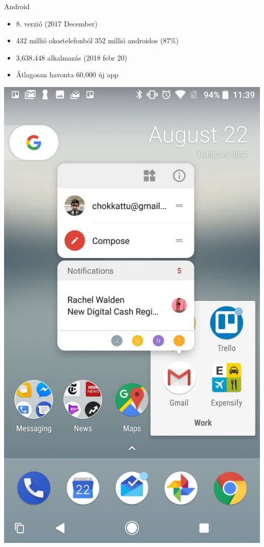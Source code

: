 \documentclass{beamer}
\begin{document}
\begin{frame}[fragile]{Android}
	\begin{minipage}{0.49\textwidth}
		\begin{itemize}
			\item 8. verzió (2017 December)
			\item 432 millió okostelefonból 352 millió androidos (87\%)
			\item 3,638,448 alkalmazás (2018 febr 20)
			\item Átlagosan havonta 60,000 új app
		\end{itemize}
	\end{minipage}
	\begin{minipage}{.49\textwidth}
		\includegraphics[width=.8\linewidth]{figures/android80.jpg}
	\end{minipage}
\end{frame}
\end{document}
